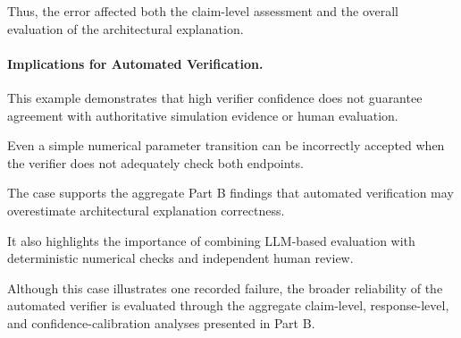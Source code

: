 Thus, the error affected
both the claim-level
assessment and the
overall evaluation of
the architectural explanation.

\paragraph{Implications for Automated Verification.}

This example demonstrates
that high verifier confidence
does not guarantee agreement
with authoritative simulation
evidence or human evaluation.

Even a simple numerical
parameter transition can
be incorrectly accepted
when the verifier does
not adequately check
both endpoints.

The case supports the
aggregate Part B findings
that automated verification
may overestimate architectural
explanation correctness.

It also highlights the
importance of combining
LLM-based evaluation with
deterministic numerical
checks and independent
human review.

Although this case illustrates
one recorded failure, the
broader reliability of the
automated verifier is
evaluated through the
aggregate claim-level,
response-level, and
confidence-calibration
analyses presented in Part B.
